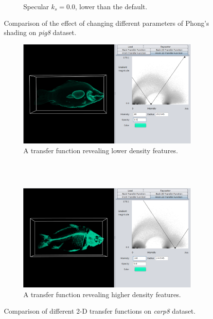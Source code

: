 \documentclass[a4paper]{article}
\begin{document}
\begin{figure}[h]
\begin{subfigure}[b]{0.45\textwidth}
    \caption{Specular $k_s=0.0$, lower than the default.}
  \end{subfigure}
  \caption{Comparison of the effect of changing different parameters of Phong's shading on \textit{pig8} dataset.}
  \label{fig:phong}
\end{figure}

\begin{figure}[h]
  \centering
  \begin{subfigure}[b]{\textwidth}
    \includegraphics[width=\textwidth]{2dtf}
    \caption{A transfer function revealing lower density features.}
  \end{subfigure}
  \\~\\
  \begin{subfigure}[b]{\textwidth}
    \includegraphics[width=\textwidth]{2dtf-skeleton}
    \caption{A transfer function revealing higher density features.}
  \end{subfigure}
  \caption{Comparison of different 2-D transfer functions on \textit{carp8} dataset.}
  \label{fig:2dtf}
\end{figure}
\end{document}
